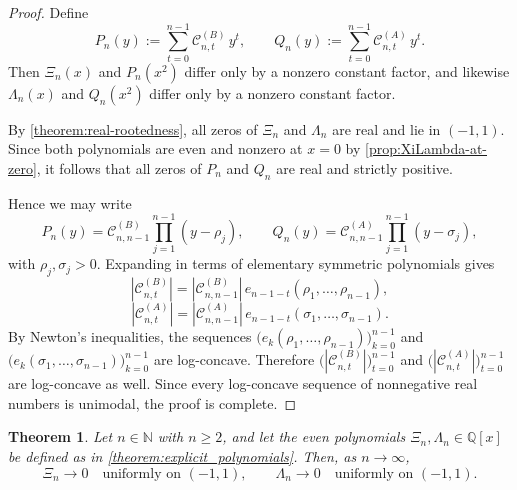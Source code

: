 \documentclass[11pt,twoside]{article}
\newtheorem{theorem}{Theorem}[section]
\numberwithin{equation}{section}
\begin{document}
\begin{proof}
Define
\[
P_n(y):=\sum_{t=0}^{n-1}\mathcal C^{(B)}_{n,t}\,y^t,
\qquad
Q_n(y):=\sum_{t=0}^{n-1}\mathcal C^{(A)}_{n,t}\,y^t.
\]
Then $\Xi_n(x)$ and $P_n(x^2)$ differ only by a nonzero constant factor, and
likewise $\Lambda_n(x)$ and $Q_n(x^2)$ differ only by a nonzero constant factor.

By \cref{theorem:real-rootedness}, all zeros of $\Xi_n$ and $\Lambda_n$ are real
and lie in $(-1,1)$. Since both polynomials are even and nonzero at $x=0$ by
\cref{prop:XiLambda-at-zero}, it follows that all zeros of $P_n$ and $Q_n$ are
real and strictly positive.

Hence we may write
\[
P_n(y)=\mathcal C^{(B)}_{n,n-1}\prod_{j=1}^{n-1}(y-\rho_j),
\qquad
Q_n(y)=\mathcal C^{(A)}_{n,n-1}\prod_{j=1}^{n-1}(y-\sigma_j),
\]
with $\rho_j,\sigma_j>0$. Expanding in terms of elementary symmetric
polynomials gives
\[
|\mathcal C^{(B)}_{n,t}|
=
|\mathcal C^{(B)}_{n,n-1}|\,
e_{n-1-t}(\rho_1,\dots,\rho_{n-1}),
\]
\[
|\mathcal C^{(A)}_{n,t}|
=
|\mathcal C^{(A)}_{n,n-1}|\,
e_{n-1-t}(\sigma_1,\dots,\sigma_{n-1}).
\]
By Newton's inequalities, the sequences
\(
\bigl(e_k(\rho_1,\dots,\rho_{n-1})\bigr)_{k=0}^{n-1}
\)
and
\(
\bigl(e_k(\sigma_1,\dots,\sigma_{n-1})\bigr)_{k=0}^{n-1}
\)
are log-concave. Therefore
\(
\bigl(|\mathcal C^{(B)}_{n,t}|\bigr)_{t=0}^{n-1}
\)
and
\(
\bigl(|\mathcal C^{(A)}_{n,t}|\bigr)_{t=0}^{n-1}
\)
are log-concave as well. Since every log-concave sequence of nonnegative real
numbers is unimodal, the proof is complete.
\end{proof}

\begin{theorem}\label{theorem:uniform-to-zero}
Let $n \in \mathbb{N}$ with $n\ge2$, and let the even polynomials
$\Xi_n,\Lambda_n\in\mathbb Q[x]$ be defined as in
\cref{theorem:explicit_polynomials}. Then, as $n\to\infty$,
\[
\Xi_n \to 0 \quad\text{uniformly on }(-1,1),
\qquad
\Lambda_n \to 0 \quad\text{uniformly on }(-1,1).
\]
\end{theorem}
\end{document}
